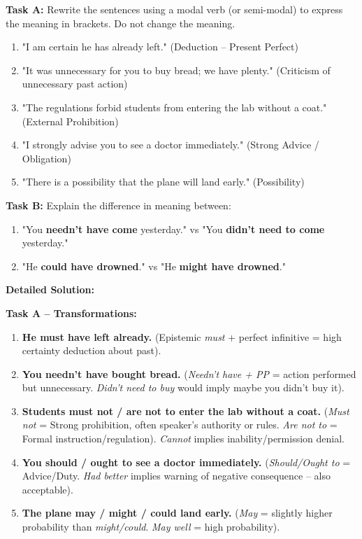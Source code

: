 \documentclass[11pt]{article}
\newcommand{\cle}[1]{{\popxbold\color{popdark}#1}}
\begin{document}
\begin{exoresolu}
\textbf{Task A:} Rewrite the sentences using a modal verb (or semi-modal) to express the meaning in brackets. Do not change the meaning.
\begin{enumerate}
    \item "I am certain he has already left." (Deduction -- Present Perfect)
    \item "It was unnecessary for you to buy bread; we have plenty." (Criticism of unnecessary past action)
    \item "The regulations forbid students from entering the lab without a coat." (External Prohibition)
    \item "I strongly advise you to see a doctor immediately." (Strong Advice / Obligation)
    \item "There is a possibility that the plane will land early." (Possibility)
\end{enumerate}

\textbf{Task B:} Explain the difference in meaning between:
\begin{enumerate}
    \item "You \textbf{needn't have come} yesterday." vs "You \textbf{didn't need to come} yesterday."
    \item "He \textbf{could have drowned}." vs "He \textbf{might have drowned}."
\end{enumerate}

\tcblower
\textbf{Detailed Solution:}

\textbf{Task A -- Transformations:}
\begin{enumerate}
    \item \textbf{He \cle{must have left} already.} (Epistemic \textit{must} + perfect infinitive = high certainty deduction about past).
    \item \textbf{You \cle{needn't have bought} bread.} (\textit{Needn't have + PP} = action performed but unnecessary. \textit{Didn't need to buy} would imply maybe you didn't buy it).
    \item \textbf{Students \cle{must not} / \cle{are not to} enter the lab without a coat.} (\textit{Must not} = Strong prohibition, often speaker's authority or rules. \textit{Are not to} = Formal instruction/regulation). \textit{Cannot} implies inability/permission denial.
    \item \textbf{You \cle{should} / \cle{ought to} see a doctor immediately.} (\textit{Should/Ought to} = Advice/Duty. \textit{Had better} implies warning of negative consequence -- also acceptable).
    \item \textbf{The plane \cle{may} / \cle{might} / \cle{could} land early.} (\textit{May} = slightly higher probability than \textit{might/could}. \textit{May well} = high probability).
\end{enumerate}


\end{exoresolu}
\end{document}
